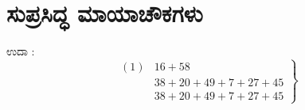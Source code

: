 \chapter{ಸುಪ್ರಸಿದ್ಧ ಮಾಯಾಚೌಕಗಳು}

ಉದಾ : 
$$
\left.
\begin{array}{rl}
(1) & 16+58 \\
	& 38+20+49+7+27+45\\
	& 38+20+49+7+27+45
\end{array}
\right\}
$$


